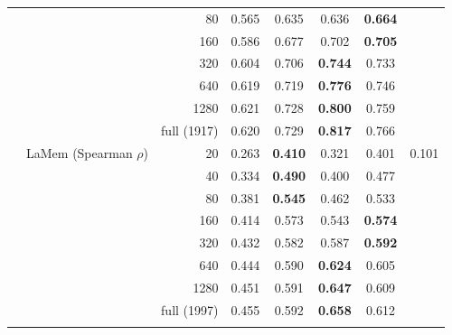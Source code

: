 \begin{table}[p]
{\begin{tabular}{llrccccc}
 &  & 80 & 0.565 & 0.635 & 0.636 & \textbf{0.664} &  \\
 &  & 160 & 0.586 & 0.677 & 0.702 & \textbf{0.705} &  \\
 &  & 320 & 0.604 & 0.706 & \textbf{0.744} & 0.733 &  \\
 &  & 640 & 0.619 & 0.719 & \textbf{0.776} & 0.746 &  \\
 &  & 1280 & 0.621 & 0.728 & \textbf{0.800} & 0.759 &  \\
 &  & full (1917) & 0.620 & 0.729 & \textbf{0.817} & 0.766 &  \\
\addlinespace
 & LaMem (Spearman $\rho$) & 20 & 0.263 & \textbf{0.410} & 0.321 & 0.401 & 0.101 \\
 &  & 40 & 0.334 & \textbf{0.490} & 0.400 & 0.477 &  \\
 &  & 80 & 0.381 & \textbf{0.545} & 0.462 & 0.533 &  \\
 &  & 160 & 0.414 & 0.573 & 0.543 & \textbf{0.574} &  \\
 &  & 320 & 0.432 & 0.582 & 0.587 & \textbf{0.592} &  \\
 &  & 640 & 0.444 & 0.590 & \textbf{0.624} & 0.605 &  \\
 &  & 1280 & 0.451 & 0.591 & \textbf{0.647} & 0.609 &  \\
 &  & full (1997) & 0.455 & 0.592 & \textbf{0.658} & 0.612 &  \\
\addlinespace
\bottomrule
\end{tabular}}
\end{table}
